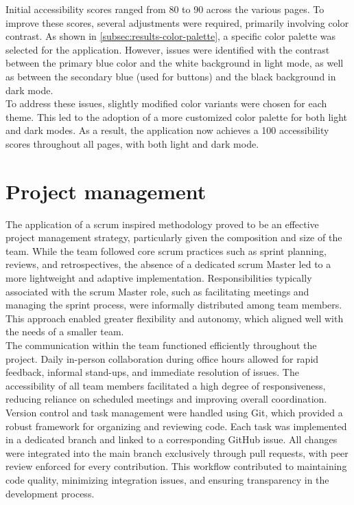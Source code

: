 Initial accessibility scores ranged from 80 to 90 across the various pages. To improve these scores, several adjustments were required, primarily involving color contrast. As shown in \ref{subsec:results-color-palette}, a specific color palette was selected for the application. However, issues were identified with the contrast between the primary blue color and the white background in light mode, as well as between the secondary blue (used for buttons) and the black background in dark mode. \\

To address these issues, slightly modified color variants were chosen for each theme. This led to the adoption of a more customized color palette for both light and dark modes. As a result, the application now achieves a 100 accessibility scores throughout all pages, with both light and dark mode. 

\section{Project management}
\label{sec:discussion-project-management}

The application of a \gls{scrum} inspired methodology proved to be an effective project management strategy, particularly given the composition and size of the team. While the team followed core \gls{scrum} practices such as sprint planning, reviews, and retrospectives, the absence of a dedicated \gls{scrum} Master led to a more lightweight and adaptive implementation. Responsibilities typically associated with the \gls{scrum} Master role, such as facilitating meetings and managing the sprint process, were informally distributed among team members. This approach enabled greater flexibility and autonomy, which aligned well with the needs of a smaller team. \\

The communication within the team functioned efficiently throughout the project. Daily in-person collaboration during office hours allowed for rapid feedback, informal stand-ups, and immediate resolution of issues. The accessibility of all team members facilitated a high degree of responsiveness, reducing reliance on scheduled meetings and improving overall coordination.\\

Version control and task management were handled using Git, which provided a robust framework for organizing and reviewing code. Each task was implemented in a dedicated branch and linked to a corresponding GitHub issue. All changes were integrated into the main branch exclusively through pull requests, with peer review enforced for every contribution. This workflow contributed to maintaining code quality, minimizing integration issues, and ensuring transparency in the development process. \\

